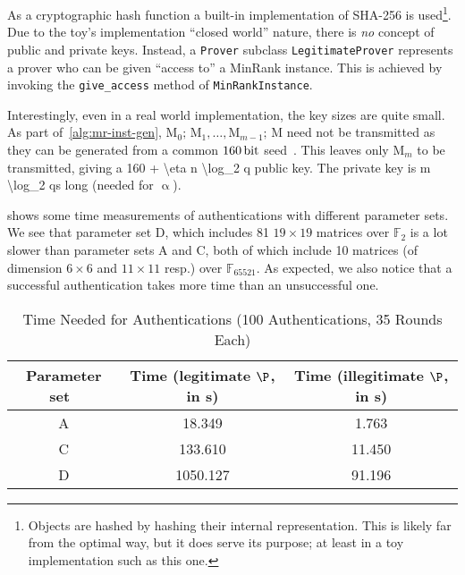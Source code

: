 \documentclass{article}
\theoremstyle{remark}
\theoremstyle{definition}
\theoremstyle{plain}
\renewcommand*{\vec}[1]{\bm{\mathrm{#1}}}
\newcommand{\matr}[1]{\bm{\mathrm{#1}}}
\begin{document}
As a cryptographic hash function a built-in implementation of SHA-256 is
used\footnote{Objects are hashed by hashing their internal representation.  This
  is likely far from the optimal way, but it does serve its purpose; at least in
  a toy implementation such as this one.}.  Due to the toy's implementation
``closed world'' nature, there is \emph{no} concept of public and private keys.
Instead, a \texttt{Prover} subclass \texttt{LegitimateProver} represents a
prover who can be given ``access to'' a MinRank instance.  This is achieved by
invoking the \texttt{give\_access} method of \texttt{MinRankInstance}.

Interestingly, even in a real world implementation, the key sizes are quite
small.  As part of~\cref{alg:mr-inst-gen},
$\matr{M}_0;\, \matr{M}_1, \ldots, \matr{M}_{m - 1}; \, \matr{M}$ need not be
transmitted as they can be generated from a common $\SI{160}{\bit}$
seed~\autocite{Cou01}.  This leaves only $\matr{M}_m$ to be transmitted, giving
a \SI[parse-numbers=false]{160 + \eta n \log_2 q}{\bit} public key.  The private
key is \SI[parse-numbers=false]{m \log_2 q}{\bit}s long (needed for
$\vec{\upalpha}$).

 shows some time measurements of authentications with different
parameter sets.  We see that parameter set D, which includes \num{81}
$19 \times 19$ matrices over $\mathbb{F}_2$ is a lot slower than parameter sets
A and C, both of which include \num{10} matrices (of dimension $6 \times 6$ and
$11 \times 11$ resp.) over $\mathbb{F}_{65521}$.  As expected, we also notice
that a successful authentication takes more time than an unsuccessful one.

\begin{table}[b]
  \centering
  \caption{Time Needed for Authentications
    (\num{100} Authentications, \num{35} Rounds Each)}\label{tbl:time}
  \begin{tabular}{c S S}
    \toprule
    Parameter set~\autocite{Cou01} & {Time (legitimate $\P$, in \si{\second})}
    & {Time (illegitimate $\P$, in \si{\second})} \\
    \midrule
    A & 18.349 & 1.763 \\
    C & 133.610 & 11.450 \\
    D & 1050.127 & 91.196 \\
    \bottomrule
  \end{tabular}
\end{table}
\end{document}
